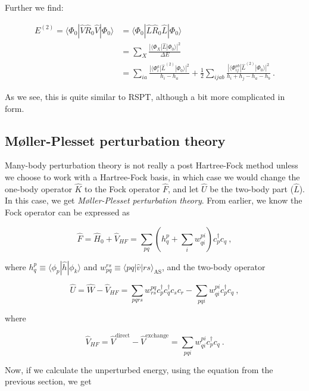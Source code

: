 \documentclass[10pt,twoside]{report}
\begin{document}
	Further we find:
	
	\begin{align}
		E^{(2)} = \langle\Phi_0|\hat{V}\hat{R}_0\hat{V}|\Phi_0\rangle &= \langle\Phi_0|\hat{L}\hat{R}_0\hat{L}|\Phi_0\rangle \\
		&= \sum_{X}\frac{|\langle\Phi_X|\hat{L}|\Phi_0\rangle|^2}{\Delta E} \\\
		&= \sum_{ia}\frac{|\langle\Phi_i^a|\hat{L}^{(2)}|\Phi_0\rangle|^2}{h_i-h_a} + \frac{1}{2}\sum_{ijab}\frac{|\langle\Phi_{ij}^{ab}|\hat{L}^{(2)}|\Phi_0\rangle|^2}{h_i+h_j-h_a-h_b}\:.
	\end{align}
	
	As we see, this is quite similar to RSPT, although a bit more complicated in form.
	
	\subsection{M\o ller-Plesset perturbation theory}
	Many-body perturbation theory is not really a post Hartree-Fock method unless we choose to work with a Hartree-Fock basis, in which case we would change the one-body operator $\hat{K}$ to the Fock operator $\hat{F}$, and let $\hat{U}$ be the two-body part ($\hat{L}$). In this case, we get \emph{M\o ller-Plesset perturbation theory}. From earlier, we know the Fock operator can be expressed as
	
	\begin{equation}
		\hat{F} = \hat{H}_0 + \hat{V}_{HF} = \sum_{pq}\left(h_q^p + \sum_i w_{qi}^{pi}\right)c_p^\dagger c_q\:,
	\end{equation}
	
	\noindent where $h_q^p \equiv \langle \phi_p|\hat{h}|\phi_k\rangle $ and $w_{pq}^{rs} \equiv \langle pq|\hat{v}|rs\rangle_{\text{AS}}$, and the two-body operator
	
	\begin{equation}
		\hat{U} = \hat{W} - \hat{V}_{HF} = \sum_{pqrs}w_{rs}^{pq} c_p^\dagger c_q^\dagger c_s c_r - \sum_{pqi}w_{qi}^{pi}c_p^\dagger c_q\:,
	\end{equation}
	
	\noindent where
	
	\begin{equation}
		\hat{V}_{HF} = \hat{V}^{\text{direct}} - \hat{V}^{\text{exchange}} = \sum_{pqi}w_{qi}^{pi}c_p^\dagger c_q\:.
	\end{equation}
	
	Now, if we calculate the unperturbed energy, using the equation from the previous section, we get
	
\end{document}
